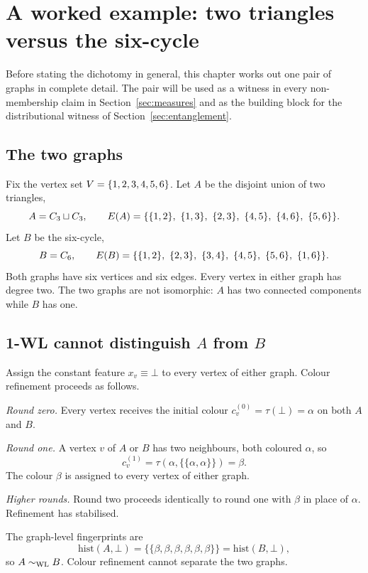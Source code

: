 
\section{A worked example: two triangles versus the six-cycle}\label{sec:warmup}

Before stating the dichotomy in general, this chapter works out one
pair of graphs in complete detail. The pair will be used as a witness
in every non-membership claim in Section~\ref{sec:measures} and as the
building block for the distributional witness of
Section~\ref{sec:entanglement}.

\subsection{The two graphs}

Fix the vertex set $V = \{1, 2, 3, 4, 5, 6\}$. Let $A$ be the
disjoint union of two triangles,
\[
A = C_3 \sqcup C_3, \qquad
\edges(A) = \{\{1,2\},\ \{1,3\},\ \{2,3\},\ \{4,5\},\ \{4,6\},\ \{5,6\}\}.
\]
Let $B$ be the six-cycle,
\[
B = C_6, \qquad
\edges(B) = \{\{1,2\},\ \{2,3\},\ \{3,4\},\ \{4,5\},\ \{5,6\},\ \{1,6\}\}.
\]
Both graphs have six vertices and six edges. Every vertex in either
graph has degree two. The two graphs are not isomorphic: $A$ has
two connected components while $B$ has one.

\subsection{1-WL cannot distinguish $A$ from $B$}

Assign the constant feature $x_v \equiv \bot$ to every vertex of
either graph. Colour refinement proceeds as follows.

\emph{Round zero.} Every vertex receives the initial colour
$c_v^{(0)} = \tau(\bot) = \alpha$ on both $A$ and $B$.

\emph{Round one.} A vertex $v$ of $A$ or $B$ has two neighbours, both
coloured $\alpha$, so
\[
c_v^{(1)} = \tau(\alpha, \{\!\{\alpha, \alpha\}\!\}) = \beta.
\]
The colour $\beta$ is assigned to every vertex of either graph.

\emph{Higher rounds.} Round two proceeds identically to round one with
$\beta$ in place of $\alpha$. Refinement has stabilised.

The graph-level fingerprints are
\[
\mathrm{hist}(A, \bot) = \{\!\{\beta,\beta,\beta,\beta,\beta,\beta\}\!\}
= \mathrm{hist}(B, \bot),
\]
so $A \sim_{\mathrm{WL}} B$. Colour refinement cannot separate the two
graphs.

